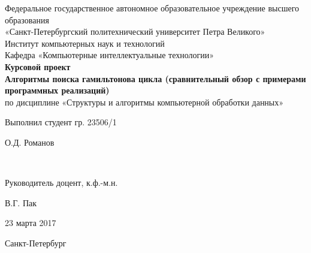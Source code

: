 \begin{titlepage}

	\begin{center}

		\large Федеральное государственное автономное образовательное учреждение высшего образования \\
		\large «Санкт-Петербургский политехнический университет Петра Великого» \\
		\large Институт компьютерных наук и технологий \\
		\large Кафедра «Компьютерные интеллектуальные технологии» \\[4cm]

		\huge {\bf Курсовой проект} \\[0.5cm]
		\large {\bf Алгоритмы поиска гамильтонова цикла (сравнительный обзор с примерами программных реализаций)} \\[0.1cm]
		\large по дисциплине «Структуры и алгоритмы компьютерной обработки данных» \\[4cm]

	\end{center}

    \begin{center}
        \begin{minipage}[t]{4cm}
            \begin{flushleft}
                Выполнил студент гр. 23506/1
            \end{flushleft}
        \end{minipage}
        \hfill
        \begin{minipage}[t]{4cm}
            \begin{flushright}
            О.Д. Романов
            \end{flushright}
        \end{minipage} \\[0.5cm]

        \begin{minipage}[t]{4cm}
            \begin{flushleft}
                Руководитель доцент, к.ф.-м.н.
            \end{flushleft}
            \flushleft
        \end{minipage}
        \hfill
        \begin{minipage}[t]{4cm}
            \begin{flushright}
                В.Г. Пак
            \end{flushright}
        \end{minipage}
    \end{center}

    \begin{flushright}
        23 марта 2017
    \end{flushright}

	
	\vfill

	\begin{center}
	    \large Санкт-Петербург\\
	    \large \the\year
	\end{center}

\thispagestyle{empty}
\end{titlepage}